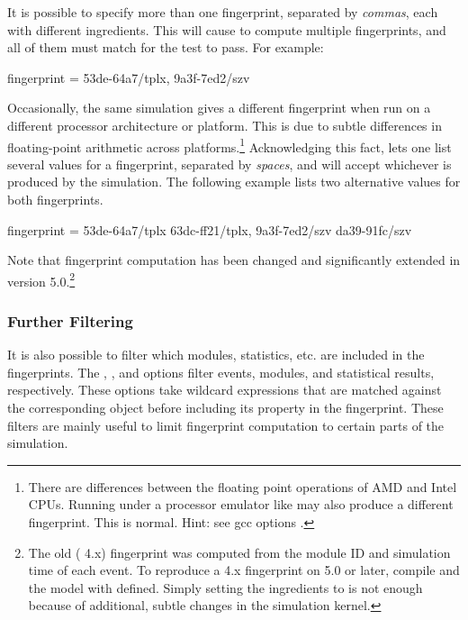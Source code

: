 It is possible to specify more than one fingerprint, separated by
\textit{commas}, each with different ingredients. This will cause {\opp} to
compute multiple fingerprints, and all of them must match for the test to
pass. For example:

\begin{inifile}
fingerprint = 53de-64a7/tplx, 9a3f-7ed2/szv
\end{inifile}

Occasionally, the same simulation gives a different fingerprint when run on
a different processor architecture or platform. This is due to subtle
differences in floating-point arithmetic across platforms.\footnote{There
are differences between the floating point operations of AMD and Intel
CPUs. Running under a processor emulator like  may also
produce a different fingerprint. This is normal. Hint: see gcc options
.} Acknowledging this fact, {\opp} lets one list
several values for a fingerprint, separated by \textit{spaces}, and will
accept whichever is produced by the simulation. The following example lists
two alternative values for both fingerprints.

\begin{inifile}
fingerprint = 53de-64a7/tplx 63dc-ff21/tplx, 9a3f-7ed2/szv da39-91fc/szv
\end{inifile}

Note that fingerprint computation has been changed and significantly
extended in {\opp} version 5.0.\footnote{The old ({\opp} 4.x) fingerprint
was computed from the module ID and simulation time of each event. To
reproduce a 4.x fingerprint on {\opp} 5.0 or later, compile {\opp} and the
model with  defined. Simply setting the
ingredients to  is not enough because of additional, subtle changes
in the simulation kernel.}


\subsubsection{Further Filtering}
\label{sec:testing:fingerprint-further-filtering}

It is also possible to filter which modules, statistics, etc. are included
in the fingerprints. The ,
, and  options
filter events, modules, and statistical results, respectively. These
options take wildcard expressions that are matched against the
corresponding object before including its property in the fingerprint.
These filters are mainly useful to limit fingerprint computation to certain
parts of the simulation.

